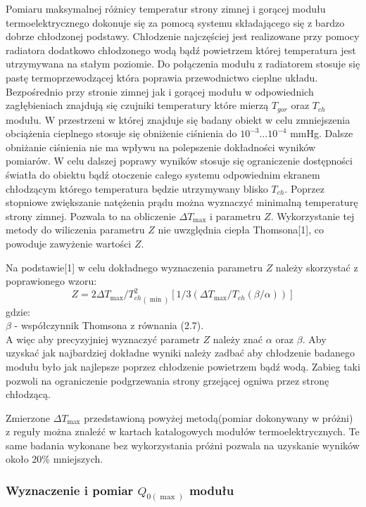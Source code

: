 \documentclass[oneside]{mgr}
\begin{document}
Pomiaru maksymalnej różnicy temperatur strony zimnej i gorącej modułu termoelektrycznego dokonuje się za pomocą systemu składającego się z bardzo dobrze chłodzonej podstawy. Chłodzenie najczęściej jest realizowane przy pomocy radiatora dodatkowo chłodzonego wodą bądź powietrzem której temperatura jest utrzymywana na stałym poziomie. Do połączenia modułu z radiatorem stosuje się pastę termoprzewodzącej która poprawia przewodnictwo cieplne układu. Bezpośrednio przy stronie zimnej jak i gorącej modułu w odpowiednich zagłębieniach znajdują się czujniki temperatury które mierzą $T_{gor}$ oraz $T_{ch}$ modułu. W przestrzeni w której znajduje się badany obiekt w celu zmniejszenia obciążenia cieplnego stosuje się obniżenie ciśnienia do $10^{-3} \dots 10^{-4}$ mmHg. Dalsze obniżanie ciśnienia nie ma wpływu na polepszenie dokładności wyników pomiarów. W celu dalszej poprawy wyników stosuje się ograniczenie dostępności światła do obiektu bądź otoczenie całego systemu odpowiednim ekranem chłodzącym którego temperatura będzie utrzymywany blisko $T_{ch}$. Poprzez stopniowe zwiększanie natężenia prądu można wyznaczyć minimalną temperaturę strony zimnej. Pozwala to na obliczenie $\Delta T_{\max}$ i parametru $Z$. Wykorzystanie tej metody do wiliczenia parametru $Z$ nie uwzględnia ciepła Thomsona[1], co powoduje zawyżenie wartości $Z$.

Na podstawie[1] w celu dokładnego wyznaczenia parametru $Z$ należy skorzystać z poprawionego wzoru:
\begin{equation}
    Z = 2 \Delta T_{\max}/{T_{ch}^2}_{(\min)}[1/3(\Delta T_{\max}/T_{ch}(\beta/\alpha))]
\end{equation}
gdzie:\\
$\beta$ - współczynnik Thomsona z równania (2.7). \\

A więc aby precyzyjniej wyznaczyć parametr $Z$ należy znać $\alpha$ oraz $\beta$. Aby uzyskać jak najbardziej dokładne wyniki należy zadbać aby chłodzenie badanego modułu było jak najlepsze poprzez chłodzenie powietrzem bądź wodą. Zabieg taki pozwoli na ograniczenie podgrzewania strony grzejącej ogniwa przez stronę chłodzącą.

Zmierzone $\Delta T_{\max}$ przedstawioną powyżej metodą(pomiar dokonywany w próżni) z reguły można znaleźć w kartach katalogowych modułów termoelektrycznych. Te same badania wykonane bez wykorzystania próżni pozwala na uzyskanie wyników około 20\% mniejszych.

\subsubsection{Wyznaczenie i pomiar $Q_{0(\max)}$ modułu}
\end{document}
